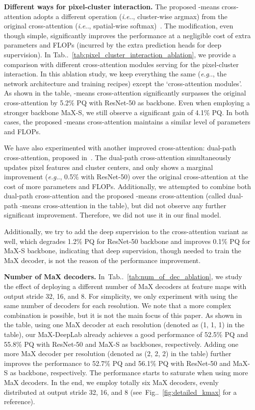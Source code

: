 \documentclass[runningheads]{llncs}
\makeatletter
\DeclareRobustCommand\onedot{\futurelet\@let@token\@onedot}
\def\@onedot{\ifx\@let@token.\else.\null\fi\xspace}
\def\eg{\emph{e.g}\onedot} \def\Eg{\emph{E.g}\onedot}
\def\ie{\emph{i.e}\onedot} \def\Ie{\emph{I.e}\onedot}
\newcommand{\figref}[1]{Fig\onedot~\ref{#1}}
\newcommand{\tabref}[1]{Tab\onedot~\ref{#1}}
\makeatother
\begin{document}
\textbf{Different ways for pixel-cluster interaction.}\quad
The proposed -means cross-attention adopts a different operation (\ie, cluster-wise argmax) from the original cross-attention (\ie, spatial-wise softmax)~\cite{vaswani2017attention}. The modification, even though simple, significantly improves the performance at a negligible cost of extra parameters and FLOPs (incurred by the extra prediction heads for deep supervision). 
In \tabref{tab:pixel_cluster_interaction_ablation}, we provide a comparison with different cross-attention modules serving for the pixel-cluster interaction.
In this ablation study, we keep everything the same (\eg, the network architecture and training recipes) except the `cross-attention modules'.
As shown in the table, -means cross-attention significantly surpasses the original cross-attention by 5.2\% PQ with ResNet-50 as backbone. Even when employing a stronger backbone MaX-S, we still observe a significant gain of 4.1\% PQ. In both cases, the proposed -means cross-attention maintains a similar level of parameters and FLOPs.

We have also experimented with another improved cross-attention: dual-path cross-attention, proposed in~\cite{wang2021max}.
The dual-path cross-attention simultaneously updates pixel features and cluster centers, and only shows a marginal improvement (\eg, 0.5\% with ResNet-50) over the original cross-attention at the cost of more parameters and FLOPs.
Additionally, we attempted to combine both dual-path cross-attention and the proposed -means cross-attention (called dual-path -means cross-attention in the table), but did not observe any further significant improvement. Therefore, we did not use it in our final model. 

Additionally, we try to add the deep supervision to the cross-attention variant as well, which degrades 1.2\% PQ for ResNet-50 backbone and improves 0.1\% PQ for MaX-S backbone, indicating that deep supervision, though needed to train the MaX decoder, is not the reason of the performance improvement.

\textbf{Number of MaX decoders.}\quad
In~\tabref{tab:num_of_dec_ablation}, we study the effect of deploying a different number of MaX decoders at feature maps with output stride 32, 16, and 8.
For simplicity, we only experiment with using the same number of decoders for each resolution.
We note that a more complex combination is possible, but it is not the main focus of this paper.
As shown in the table, using one MaX decoder at each resolution (denoted as (1, 1, 1) in the table), our MaX-DeepLab already achieves a good performance of 52.5\% PQ and 55.8\% PQ with ResNet-50 and MaX-S as backbones, respectively.
Adding one more MaX decoder per resolution (denoted as (2, 2, 2) in the table) further improves the performance to 52.7\% PQ and 56.1\% PQ with ResNet-50 and MaX-S as backbone, respectively.
The performance starts to saturate when using more MaX decoders.
In the end, we employ totally six MaX decoders, evenly distributed at output stride 32, 16, and 8 (see~\figref{fig:detailed_kmax} for a reference).
\end{document}
